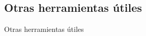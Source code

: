 \documentclass[../slides.tex]{subfiles}
\begin{document}
    \subsection{Otras herramientas útiles}
    \begin{frame}{Otras herramientas útiles}
    \end{frame}
    
\end{document}
